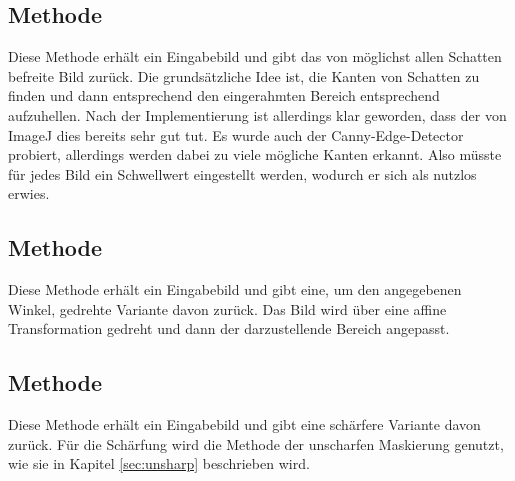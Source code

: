 \subsection*{Methode }
Diese Methode erhält ein Eingabebild und gibt das von möglichst allen Schatten befreite Bild zurück.
Die grundsätzliche Idee ist, die Kanten von Schatten zu finden und dann entsprechend den eingerahmten Bereich entsprechend aufzuhellen.
Nach der Implementierung ist allerdings klar geworden, dass der  von ImageJ dies bereits sehr gut tut.
Es wurde auch der Canny-Edge-Detector probiert, allerdings werden dabei zu viele mögliche Kanten erkannt. Also müsste für jedes Bild ein Schwellwert eingestellt werden, wodurch er sich als nutzlos erwies.


%


\subsection*{Methode }
Diese Methode erhält ein Eingabebild und gibt eine, um den angegebenen Winkel, gedrehte Variante davon zurück.
Das Bild wird über eine affine Transformation gedreht und dann der darzustellende Bereich angepasst.


\subsection*{Methode }
Diese Methode erhält ein Eingabebild und gibt eine schärfere Variante davon zurück.
Für die Schärfung wird die Methode der unscharfen Maskierung genutzt, wie sie in Kapitel \ref{sec:unsharp} beschrieben wird.

